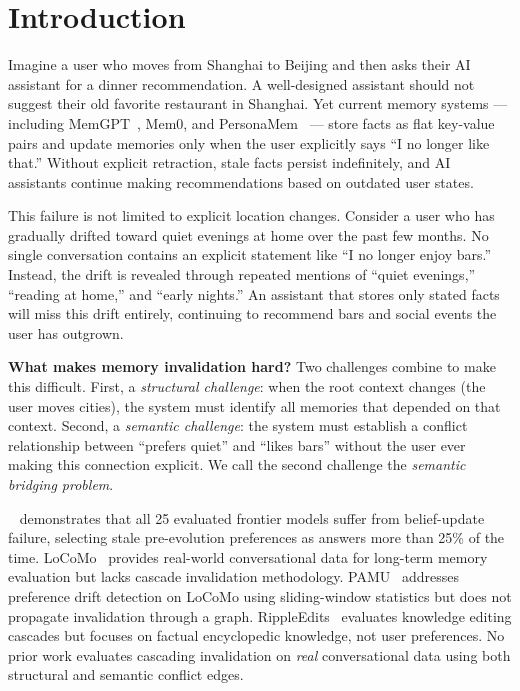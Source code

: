 \section{Introduction}
\label{sec:intro}

Imagine a user who moves from Shanghai to Beijing and then asks their AI assistant for a dinner recommendation. A well-designed assistant should not suggest their old favorite restaurant in Shanghai. Yet current memory systems — including MemGPT~\cite{packer2024memgpt}, Mem0, and PersonaMem~\cite{jiang2025personamem} — store facts as flat key-value pairs and update memories only when the user explicitly says ``I no longer like that.'' Without explicit retraction, stale facts persist indefinitely, and AI assistants continue making recommendations based on outdated user states.

This failure is not limited to explicit location changes. Consider a user who has gradually drifted toward quiet evenings at home over the past few months. No single conversation contains an explicit statement like ``I no longer enjoy bars.'' Instead, the drift is revealed through repeated mentions of ``quiet evenings,'' ``reading at home,'' and ``early nights.'' An assistant that stores only stated facts will miss this drift entirely, continuing to recommend bars and social events the user has outgrown.

{\bf What makes memory invalidation hard?} Two challenges combine to make this difficult. First, a \textit{structural challenge}: when the root context changes (the user moves cities), the system must identify all memories that depended on that context. Second, a \textit{semantic challenge}: the system must establish a conflict relationship between ``prefers quiet'' and ``likes bars'' without the user ever making this connection explicit. We call the second challenge the \textit{semantic bridging problem}.

 \horizonbench~\cite{li2026horizonbench} demonstrates that all 25 evaluated frontier models suffer from belief-update failure, selecting stale pre-evolution preferences as answers more than 25\% of the time. LoCoMo~\cite{maharana2024locomo} provides real-world conversational data for long-term memory evaluation but lacks cascade invalidation methodology. PAMU~\cite{sun2025pamu} addresses preference drift detection on LoCoMo using sliding-window statistics but does not propagate invalidation through a graph. RippleEdits~\cite{cohen2023rippleedits} evaluates knowledge editing cascades but focuses on factual encyclopedic knowledge, not user preferences. No prior work evaluates cascading invalidation on \textit{real} conversational data using both structural and semantic conflict edges.

